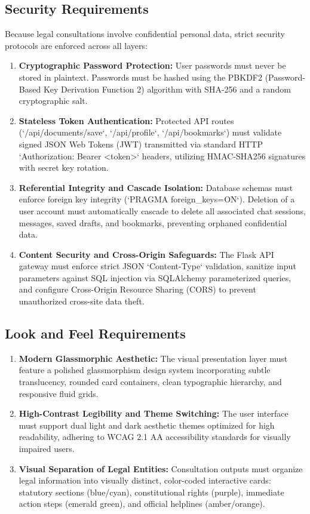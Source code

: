 \subsection{Security Requirements}
\label{subsec:security_requirements}

Because legal consultations involve confidential personal data, strict security protocols are enforced across all layers:
\begin{enumerate}
    \item \textbf{Cryptographic Password Protection:} User passwords must never be stored in plaintext. Passwords must be hashed using the PBKDF2 (Password-Based Key Derivation Function 2) algorithm with SHA-256 and a random cryptographic salt.
    \item \textbf{Stateless Token Authentication:} Protected API routes (`/api/documents/save`, `/api/profile`, `/api/bookmarks`) must validate signed JSON Web Tokens (JWT) transmitted via standard HTTP `Authorization: Bearer <token>` headers, utilizing HMAC-SHA256 signatures with secret key rotation.
    \item \textbf{Referential Integrity and Cascade Isolation:} Database schemas must enforce foreign key integrity (`PRAGMA foreign_keys=ON`). Deletion of a user account must automatically cascade to delete all associated chat sessions, messages, saved drafts, and bookmarks, preventing orphaned confidential data.
    \item \textbf{Content Security and Cross-Origin Safeguards:} The Flask API gateway must enforce strict JSON `Content-Type` validation, sanitize input parameters against SQL injection via SQLAlchemy parameterized queries, and configure Cross-Origin Resource Sharing (CORS) to prevent unauthorized cross-site data theft.
\end{enumerate}

\subsection{Look and Feel Requirements}
\label{subsec:look_and_feel_requirements}

\begin{enumerate}
    \item \textbf{Modern Glassmorphic Aesthetic:} The visual presentation layer must feature a polished glassmorphism design system incorporating subtle translucency, rounded card containers, clean typographic hierarchy, and responsive fluid grids.
    \item \textbf{High-Contrast Legibility and Theme Switching:} The user interface must support dual light and dark aesthetic themes optimized for high readability, adhering to WCAG 2.1 AA accessibility standards for visually impaired users.
    \item \textbf{Visual Separation of Legal Entities:} Consultation outputs must organize legal information into visually distinct, color-coded interactive cards: statutory sections (blue/cyan), constitutional rights (purple), immediate action steps (emerald green), and official helplines (amber/orange).
\end{enumerate}

